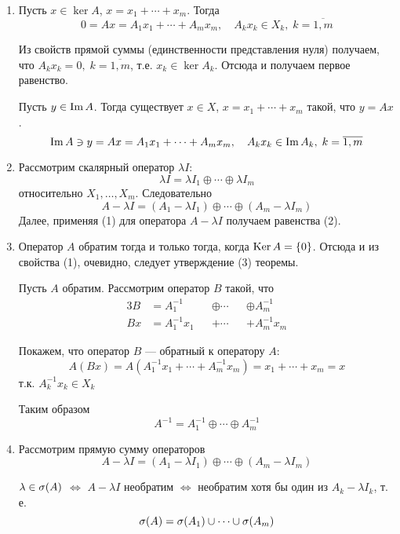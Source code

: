 \begin{proofbreak}
    \begin{enumerate}
        \item Пусть $ x \in \ker A $, $x = x_1 + \dotsb + x_m$. Тогда
            \[ 0 = Ax = A_1 x_1 + \dotsb + A_m x_m, \quad A_k x_k \in X_k, \; k
            = \overline{1,m}\]

            Из свойств прямой суммы (единственности представления нуля)
            получаем, что $A_k x_k = 0, \; k = \overline{1,m}$, т.е. $x_k \in
            \ker A_k $. Отсюда и получаем первое равенство.

            Пусть $y \in \operatorname{Im} A$. Тогда существует $x\in X$, $x = x_1 + \dotsb +
            x_m$ такой, что $y = Ax$.
            \[ \operatorname{Im} A \ni y = Ax = A_1 x_1 + \dots + A_m x_m, \quad A_k x_k \in
                \operatorname{Im} A_k, \; k
            = \overline{1,m}\]
        \item Рассмотрим скалярный оператор $\lambda I$:
            \[\lambda I = \lambda I_1 \oplus \dotsb \oplus \lambda I_m\] 
            относительно $X_1, \dotsc, X_m$. Следовательно
            \[ A - \lambda I = (A_1 - \lambda I_1) \oplus \dotsb \oplus (A_m -
                \lambda I_m) \]
            Далее, применяя (1) для оператора $A-\lambda I$ получаем равенства
            (2).
        \item Оператор $A$ обратим тогда и только тогда, когда $\operatorname{Ker} A = \left\{0\right\}$.
            Отсюда и из свойства (1), очевидно, следует утверждение (3) теоремы.

            Пусть $A$ обратим. Рассмотрим оператор $B$ такой, что
            \begin{alignat*}{3}
                B &= A_1^{-1} &&\oplus \dotsb &&\oplus A_m^{-1} \\
                Bx &= A_1^{-1} x_1 &&+ \dotsb &&+ A_m^{-1} x_m
            \end{alignat*}

            Покажем, что оператор $B$ — обратный к оператору $A$:
            \[ A(Bx) = A(A_1^{-1} x_1 + \dotsb + A_m^{-1} x_m) = x_1 + \dotsb +
                x_m = x \]
            т.к. $A_k^{-1} x_k \in X_k$
            
            Таким образом
            \[ A^{-1} = A_1^{-1} \oplus \dotsb \oplus A_m^{-1} \]
        \item Рассмотрим прямую сумму операторов
            \[ A - \lambda I = (A_1 - \lambda I_1) \oplus \dotsb \oplus (A_m -
                \lambda I_m) \]
            
            $\lambda \in \operatorname{\sigma}(A)$ $\Leftrightarrow$ $A-\lambda I$ необратим
            $\Leftrightarrow$ необратим хотя бы один из $A_k -\lambda I_k$, т.
            е.
            \[ \operatorname{\sigma}(A) = \operatorname{\sigma}(A_1) \cup \dots \cup \operatorname{\sigma}(A_m) \]
    \end{enumerate}
\end{proofbreak}

